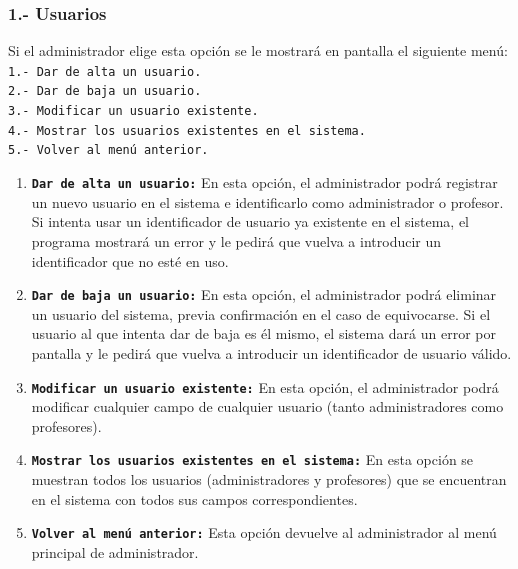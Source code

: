 \documentclass{book}
\begin{document}
\subsubsection{1.- Usuarios}{
Si el administrador elige esta opción se le mostrará en pantalla el siguiente menú:\\
\texttt{1.- Dar de alta un usuario.}\\
\texttt{2.- Dar de baja un usuario.}\\
\texttt{3.- Modificar un usuario existente.}\\
\texttt{4.- Mostrar los usuarios existentes en el sistema.}\\
\texttt{5.- Volver al menú anterior.}
\begin{enumerate}
	\item \textbf{\texttt{Dar de alta un usuario:}} En esta opción, el administrador podrá registrar un nuevo usuario en el sistema e identificarlo como administrador o profesor. Si intenta usar un identificador de usuario ya existente en el sistema, el programa mostrará un error y le pedirá que vuelva a introducir un identificador que no esté en uso.
	\item \textbf{\texttt{Dar de baja un usuario:}} En esta opción, el administrador podrá eliminar un usuario del sistema, previa confirmación en el caso de equivocarse. Si el usuario al que intenta dar de baja es él mismo, el sistema dará un error por pantalla y le pedirá que vuelva a introducir un identificador de usuario válido.
	\item \textbf{\texttt{Modificar un usuario existente:}} En esta opción, el administrador podrá modificar cualquier campo de cualquier usuario (tanto administradores como profesores).
	\item \textbf{\texttt{Mostrar los usuarios existentes en el sistema:}} En esta opción se muestran todos los usuarios (administradores y profesores) que se encuentran en el sistema con todos sus campos correspondientes.
	\item \textbf{\texttt{Volver al menú anterior:}} Esta opción devuelve al administrador al menú principal de administrador.
\end{enumerate}
}
\end{document}
